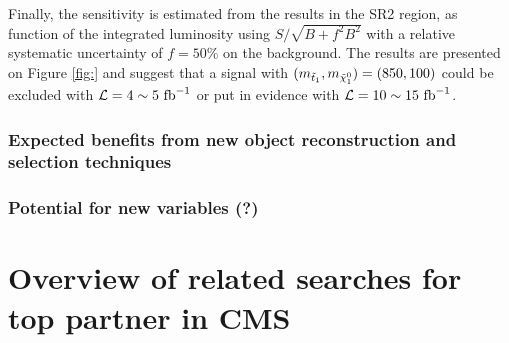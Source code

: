 

       Finally, the sensitivity is estimated from the results in the SR2 region, as function 
       of the integrated luminosity using $S / \sqrt{B + f^2 B^2}$ with a relative systematic 
       uncertainty of $f = 50\%$ on the background. The results are presented on Figure 
       \ref{fig:} and suggest that a signal with $(m_{\tilde{t}_1}, m_{\tilde{\chi}_1^0}) = (850,100)$ 
       could be excluded with $\mathcal{L} = 4\sim5~\text{fb}^{-1}$ or put in evidence with 
       $\mathcal{L} = 10\sim15~\text{fb}^{-1}$.




         \subsubsection{Expected benefits from new object reconstruction and selection techniques}


         \subsubsection{Potential for new variables (?)}





            

            
    
    \section{Overview of related searches for top partner in CMS \label{sec:analysis_overviewStopSearches}}
        
